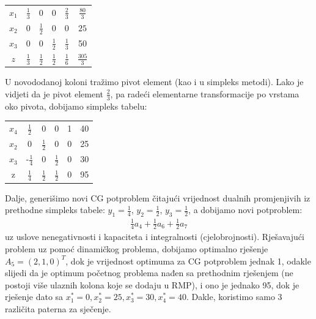 \documentclass[a4paper, utf8, 11pt, colorlinks]{book}
\begin{document}
\begin{center}
	
	\begin{tabular}{ccccc|c}
		$x_1$ &     $\frac{1}{3}$  &   0 & 0  &      $ \frac{2}{3}$           & $\frac{80}{3}$ \\
		$x_2$ &     0              &  $\frac{1}{2}$  & 0     & 0                 &     $25$ \\
		$x_3$ &     0              &  0    &  $\frac{1}{2}$  & $ \frac{1}{3}$    & 50 \\ \hline
		$z$   &  $\frac{1}{3}$     &  $\frac{1}{2}$   &  $\frac{1}{2}$ &   $\frac{1}{6}$   & $\frac{305}{3}$ 
	\end{tabular}
\end{center}
U novododanoj koloni tražimo pivot element (kao i u simpleks metodi). Lako je vidjeti da je pivot element $\frac{2}{3}$, pa radeći elementarne transformacije po vrstama oko pivota, dobijamo simpleks tabelu:
\begin{center}
	\begin{tabular}{ccccc| c}
		  $x_4$ & $\frac{1}{2}$ & 0 & 0 & 1 & 40 \\
		  $x_2$ & 0 & $\frac{1}{2}$ & 0 & 0 & 25 \\
		  $x_3$ & -$\frac{1}{4}$ & 0 & $\frac{1}{2}$ & 0 & 30 \\ \hline
		  z  & $\frac{1}{4}$ & $\frac{1}{2}$ & $\frac{1}{2}$ & 0 & 95 
	\end{tabular}
\end{center}

Dalje, generišimo novi CG potproblem čitajući vrijednost dualnih promjenjivih iz prethodne simpleks tabele: $y_1 = \frac{1}{4}$, $y_2 = \frac{1}{2}$, $y_3= \frac{1}{2}$, a dobijamo novi potproblem:
\begin{align*}
	 \frac{1}{4} a_4 + \frac{1}{2} a_6 + \frac{1}{2} a_7
\end{align*}
uz uslove nenegativnosti i kapaciteta i integralnosti (cjelobrojnosti). Rješavajući problem uz pomoć dinamičkog problema, dobijamo optimalno rješenje $A_5 = (2,1,0)^T$, dok je vrijednost optimuma za CG potproblem jednak 1, odakle slijedi da je optimum početnog problema nađen sa prethodnim rješenjem (ne postoji više ulaznih kolona koje se dodaju u RMP), i ono je jednako 95, dok je rješenje dato sa $x_1^* = 0, x_2^* = 25, x_3^*=30, x_4^*= 40$. Dakle, koristimo samo 3 različita paterna za sječenje. 

 
\end{document}
